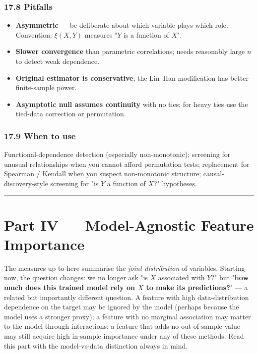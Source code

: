 \documentclass{article}
\providecommand{\tightlist}{\setlength{\itemsep}{0pt}\setlength{\parskip}{0pt}}
\let\oldsection\section
\renewcommand{\section}{\clearpage\oldsection}
\begin{document}
\subsubsection{17.8 Pitfalls}\label{178-pitfalls}

\begin{itemize}
\tightlist
\item
  \textbf{Asymmetric} --- be deliberate about which variable plays which
  role. Convention: \(\xi(X, Y)\) measures "\(Y\) is a function of
  \(X\)".
\item
  \textbf{Slower convergence} than parametric correlations; needs
  reasonably large \(n\) to detect weak dependence.
\item
  \textbf{Original estimator is conservative}; the Lin--Han modification
  has better finite-sample power.
\item
  \textbf{Asymptotic null assumes continuity} with no ties; for heavy
  ties use the tied-data correction or permutation.
\end{itemize}

\subsubsection{17.9 When to use}\label{179-when-to-use}

Functional-dependence detection (especially non-monotonic); screening
for unusual relationships when you cannot afford permutation tests;
replacement for Spearman / Kendall when you suspect non-monotonic
structure; causal-discovery-style screening for "is \(Y\) a function of
\(X\)?" hypotheses.

\begin{center}\rule{0.5\linewidth}{0.5pt}\end{center}

\section{Part IV --- Model-Agnostic Feature
Importance}\label{part-iv--model-agnostic-feature-importance}

The measures up to here summarise the \emph{joint distribution} of
variables. Starting now, the question changes: we no longer ask "is
\(X\) associated with \(Y\)?" but "\textbf{how much does this trained
model rely on \(X\) to make its predictions?}" --- a related but
importantly different question. A feature with high data-distribution
dependence on the target may be ignored by the model (perhaps because
the model uses a stronger proxy); a feature with no marginal association
may matter to the model through interactions; a feature that adds no
out-of-sample value may still acquire high in-sample importance under
any of these methods. Read this part with the model-vs-data distinction
always in mind.
\end{document}

